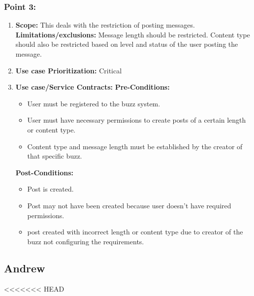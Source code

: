 \documentclass[11pt]{article}
\begin{document}
\subsubsection{Point 3:} 
\begin{enumerate}
\item 
\textbf{Scope:}
This deals with the restriction of posting messages.
\newline
\textbf{Limitations/exclusions:} 
Message length should be restricted. Content type should also be restricted based on level and status of the user posting the message.

\item 
\textbf{Use case Prioritization:} Critical

\item 
\textbf{Use case/Service Contracts:} 
\newline
\textbf{Pre-Conditions: }
\begin{itemize}
\item User must be registered to the buzz system.
\item User must have necessary permissions to create posts of a certain length or content type.
\item Content type and message length must be established by the creator of that specific buzz.
\end{itemize}
 

\textbf{Post-Conditions: }
\begin{itemize}
\item Post is created.
\item Post may not have been created because user doesn't have required permissions.
\item post created with incorrect length or content type due to creator of the buzz not configuring the requirements.
\end{itemize}
\end{enumerate}

\newpage

\subsection{Andrew}
<<<<<<< HEAD
\end{document}
